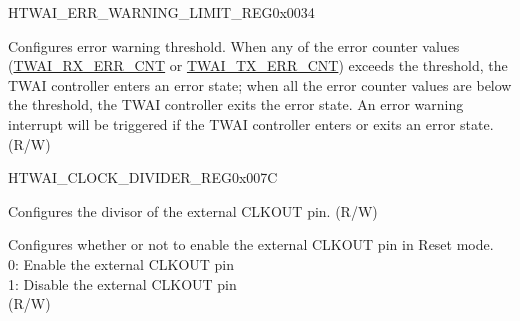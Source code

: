 \begin{register}{H}{TWAI\_ERR\_WARNING\_LIMIT\_REG}{0x0034}\label{regdesc:TWAIERRWARNINGLIMITREG}
%
%
\regnewline%
\begin{regdesc}\begin{reglist}
\label{fielddesc:TWAIERRWARNINGLIMIT}\item [TWAI\_ERR\_WARNING\_LIMIT] Configures error warning threshold. When any of the error counter values (\hyperref[fielddesc:TWAIRXERRCNT]{TWAI\_RX\_ERR\_CNT} or \hyperref[fielddesc:TWAITXERRCNT]{TWAI\_TX\_ERR\_CNT}) exceeds the threshold, the TWAI controller enters an error state; when all the error counter values are below the threshold, the TWAI controller exits the error state. An error warning interrupt will be triggered if the TWAI controller enters or exits an error state. (R/W)
\end{reglist}\end{regdesc}
\end{register}


\begin{register}{H}{TWAI\_CLOCK\_DIVIDER\_REG}{0x007C}\label{regdesc:TWAICLOCKDIVIDERREG}
%
%
%
\regnewline%
\begin{regdesc}\begin{reglist}
\label{fielddesc:TWAICD}\item [TWAI\_CD] Configures the divisor of the external CLKOUT pin. (R/W)
\label{fielddesc:TWAICLOCKOFF}\item [TWAI\_CLOCK\_OFF] Configures whether or not to enable the external CLKOUT pin in Reset mode. \\
0: Enable the external CLKOUT pin\\
1: Disable the external CLKOUT pin \\
(R/W)
\end{reglist}\end{regdesc}
\end{register}


